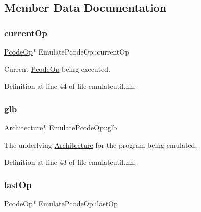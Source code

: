 \subsection{Member Data Documentation}
\mbox{\label{class_emulate_pcode_op_ab52f4b9da769c03f03988e9500a565e8}} 
\subsubsection{\texorpdfstring{currentOp}{currentOp}}
{\footnotesize\ttfamily \mbox{\hyperlink{class_pcode_op}{Pcode\+Op}}$\ast$ Emulate\+Pcode\+Op\+::current\+Op\hspace{0.3cm}{\ttfamily [protected]}}



Current \mbox{\hyperlink{class_pcode_op}{Pcode\+Op}} being executed. 



Definition at line 44 of file emulateutil.\+hh.

\mbox{\label{class_emulate_pcode_op_a42e18029a70d836acb3fd457a185b11a}} 
\subsubsection{\texorpdfstring{glb}{glb}}
{\footnotesize\ttfamily \mbox{\hyperlink{class_architecture}{Architecture}}$\ast$ Emulate\+Pcode\+Op\+::glb\hspace{0.3cm}{\ttfamily [protected]}}



The underlying \mbox{\hyperlink{class_architecture}{Architecture}} for the program being emulated. 



Definition at line 43 of file emulateutil.\+hh.

\mbox{\label{class_emulate_pcode_op_a37c1a6611accb11ed7f4fc242e1d6a3b}} 
\subsubsection{\texorpdfstring{lastOp}{lastOp}}
{\footnotesize\ttfamily \mbox{\hyperlink{class_pcode_op}{Pcode\+Op}}$\ast$ Emulate\+Pcode\+Op\+::last\+Op\hspace{0.3cm}{\ttfamily [protected]}}




